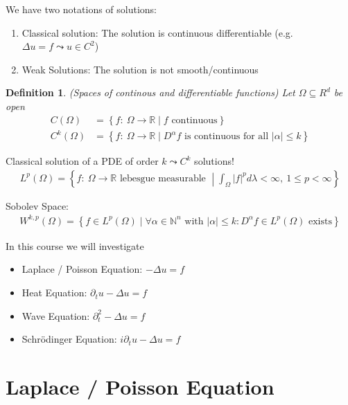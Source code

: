 \documentclass{report}
\theoremstyle{tommy}
\newtheorem{defn}{Definition}
\begin{document}
  We have two notations of solutions:
  \begin{enumerate}
    \item Classical solution: The solution is continuous differentiable (e.g. \( \Delta u = f  \leadsto u \in C^2  \))
    \item Weak Solutions: The solution is not smooth/continuous
  \end{enumerate}

  \begin{defn} (Spaces of continous and differentiable functions)
    Let \(\Omega \subseteq R^d\) be open
    \begin{align*}
      C(\Omega) &= \left\{ f: \ \Omega \to \mathbb{R} \mid f \text{ continuous} \right\} \\
      C^k(\Omega) &= \left\{ f: \ \Omega \to \mathbb{R} \mid D^\alpha f \text{ is continuous for all } |\alpha| \le k \right\}
    \end{align*}
  \end{defn}

  Classical solution of a PDE of order \(k \leadsto C^k\) solutions!
  \begin{align*}
    L^p(\Omega) = \left\{ f: \ \Omega \to \mathbb{R} \text{ lebesgue measurable } \middle| \int_\Omega |f|^p d\lambda < \infty,\ 1 \le p < \infty \right\}
  \end{align*}

  Sobolev Space:
  \begin{align*}
    W^{k,p}(\Omega)= \left \{ f \in L^p(\Omega) \mid \forall \alpha \in \mathbb{N}^n \text{ with } |\alpha| \leq k: D^{\alpha}f \in L^p(\Omega) \text{ exists}  \right \}
  \end{align*}

  In this course we will investigate
  \begin{itemize}
    \item Laplace / Poisson Equation: \(-\Delta u = f\)
    \item Heat Equation: \(\partial_t u - \Delta u = f\)
    \item Wave Equation: \(\partial_t^2 - \Delta u = f\)
    \item Schrödinger Equation: \(i \partial_t u - \Delta u = f\)
  \end{itemize}


  \chapter{Laplace / Poisson Equation}
\end{document}
